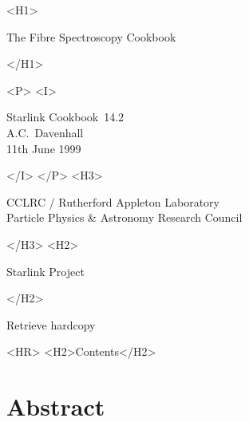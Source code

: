 \documentclass[twoside,11pt]{article}
\newcommand{\stardoccategory}  {Starlink Cookbook}
\newcommand{\stardocsource}    {sc\stardocnumber}
\newcommand{\stardocnumber}    {14.2}
\newcommand{\stardocauthors}   {A.C.~Davenhall}
\newcommand{\stardocdate}      {11th June 1999}
\newcommand{\stardoctitle}     {The Fibre Spectroscopy Cookbook}
\newcommand{\htmladdnormallink}[2]{#1}
\newcommand{\htmladdimg}[1]{}
\newcommand{\htmlref}[2]{#1}
\newcommand{\htmladdtonavigation}[1]{}
\newcommand{\xlabel}[1]{}
\begin{document}
\begin{htmlonly}
   \xlabel{}
   \begin{rawhtml} <H1> \end{rawhtml}
      \stardoctitle
   \begin{rawhtml} </H1> \end{rawhtml}


   \begin{rawhtml} <P> <I> \end{rawhtml}
   \stardoccategory\ \stardocnumber \\
   \stardocauthors \\
   \stardocdate
   \begin{rawhtml} </I> </P> <H3> \end{rawhtml}
      \htmladdnormallink{CCLRC}{http://www.cclrc.ac.uk} /
      \htmladdnormallink{Rutherford Appleton Laboratory}
                        {http://www.cclrc.ac.uk/ral} \\
      \htmladdnormallink{Particle Physics \& Astronomy Research Council}
                        {http://www.pparc.ac.uk} \\
   \begin{rawhtml} </H3> <H2> \end{rawhtml}
      \htmladdnormallink{Starlink Project}{http://star-www.rl.ac.uk/}
   \begin{rawhtml} </H2> \end{rawhtml}
   \htmladdnormallink{\htmladdimg{source.gif} Retrieve hardcopy}
      {http://star-www.rl.ac.uk/cgi-bin/hcserver?\stardocsource}\\

  \label{stardoccontents}
  \begin{rawhtml} 
    <HR>
    <H2>Contents</H2>
  \end{rawhtml}
  \htmladdtonavigation{\htmlref{\htmladdimg{contents_motif.gif}}
        {stardoccontents}}

  \section{\xlabel{abstract}Abstract}
\end{htmlonly}
\end{document}
